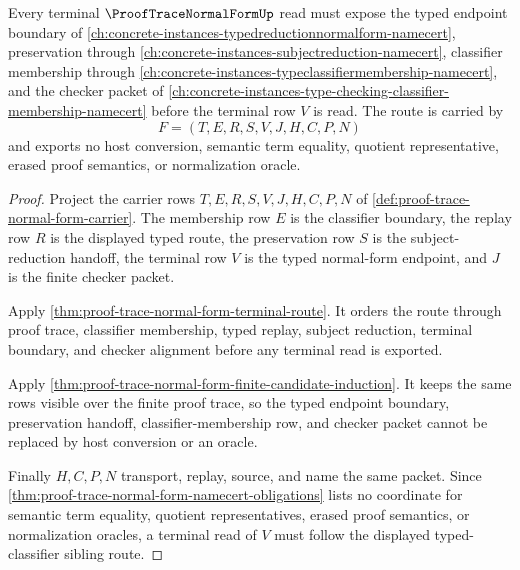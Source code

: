 \begin{theorem}
\label{thm:proof-trace-normal-form-typed-classifier-route}
Every terminal $\ProofTraceNormalFormUp$ read must expose the typed endpoint boundary of \autoref{ch:concrete-instances-typedreductionnormalform-namecert}, preservation through \autoref{ch:concrete-instances-subjectreduction-namecert}, classifier membership through \autoref{ch:concrete-instances-typeclassifiermembership-namecert}, and the checker packet of \autoref{ch:concrete-instances-type-checking-classifier-membership-namecert} before the terminal row $V$ is read. The route is carried by
$$
F=(T,E,R,S,V,J,H,C,P,N)
$$
and exports no host conversion, semantic term equality, quotient representative, erased proof semantics, or normalization oracle.
\end{theorem}
\begin{proof}
Project the carrier rows $T,E,R,S,V,J,H,C,P,N$ of \autoref{def:proof-trace-normal-form-carrier}. The membership row $E$ is the classifier boundary, the replay row $R$ is the displayed typed route, the preservation row $S$ is the subject-reduction handoff, the terminal row $V$ is the typed normal-form endpoint, and $J$ is the finite checker packet.

Apply \autoref{thm:proof-trace-normal-form-terminal-route}. It orders the route through proof trace, classifier membership, typed replay, subject reduction, terminal boundary, and checker alignment before any terminal read is exported.

Apply \autoref{thm:proof-trace-normal-form-finite-candidate-induction}. It keeps the same rows visible over the finite proof trace, so the typed endpoint boundary, preservation handoff, classifier-membership row, and checker packet cannot be replaced by host conversion or an oracle.

Finally $H,C,P,N$ transport, replay, source, and name the same packet. Since \autoref{thm:proof-trace-normal-form-namecert-obligations} lists no coordinate for semantic term equality, quotient representatives, erased proof semantics, or normalization oracles, a terminal read of $V$ must follow the displayed typed-classifier sibling route.
\end{proof}

